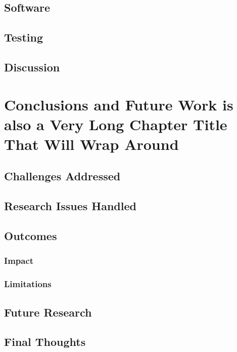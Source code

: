 \documentclass[12pt]{report}	%
\begin{document}
\section{Software}

\section{Testing}

\section{Discussion}
	
\chapter{Conclusions and Future Work is also a Very Long Chapter Title That Will Wrap Around}
\section{Challenges Addressed}
\section{Research Issues Handled}
\section{Outcomes}
\subsection{Impact}
\subsection{Limitations}
\section{Future Research}
\section{Final Thoughts}

%	

%	
%
%
%
\appendices

%
%
%
\end{document}
